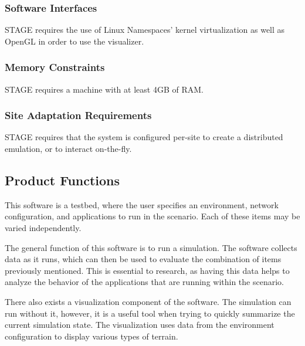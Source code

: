 \documentclass[titlepage]{article}
\begin{document}

\subsubsection{Software Interfaces%
  \label{software-interfaces}%
}

STAGE requires the use of Linux Namespaces' kernel virtualization as well as OpenGL in order to use the visualizer.


\subsubsection{Memory Constraints%
  \label{memory-constraints}%
}

STAGE requires a machine with at least 4GB of RAM.


\subsubsection{Site Adaptation Requirements%
  \label{site-adaptation-requirements}%
}

STAGE requires that the system is configured per-site to create a distributed emulation, or to interact on-the-fly.


\subsection{Product Functions%
  \label{product-functions}%
}

This software is a testbed, where the user specifies an environment, network configuration, and applications to run in the scenario. Each of these items may be varied independently.

The general function of this software is to run a simulation.  The software collects data as it runs, which can then be used to evaluate the combination of items previously mentioned.  This is essential to research, as having this data helps to analyze the behavior of the applications that are running within the scenario.

There also exists a visualization component of the software. The simulation can run without it, however, it is a useful tool when trying to quickly summarize the current simulation state.  The visualization uses data from the environment configuration to display various types of terrain.
\end{document}
